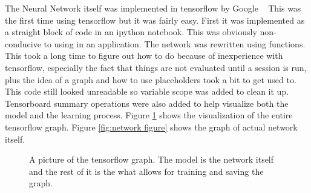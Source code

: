 \documentclass[12pt,twocolumn,letterpaper]{article}
\begin{document}
The Neural Network itself was implemented in tensorflow by Google ~\cite{Google} 
This was the first time using tensorflow but it was fairly easy. First it was 
implemented as a straight block of code in an ipython notebook. This was 
obviously non-conducive to using in an application. The network was rewritten 
using functions. This took a long time to figure out how to do because of 
inexperience with tensorflow, especially the fact that things are not evaluated 
until a session is run, plus the idea of a graph and how to use placeholders 
took a bit to get used to. This code still looked unreadable so variable scope 
was added to clean it up. Tensorboard summary operations were also added to help 
visualize both the model and the learning process. Figure \ref{fig:model image} shows the visualization 
of the entire tensorflow graph. Figure \ref{fig:network figure} shows the graph of actual network itself.


\begin{figure}[t]
\begin{center}
\end{center}
   \caption{A picture of the tensorflow graph. The model is the network itself 
   and the rest of it is the what allows for training and saving the graph.}
\label{fig:model image}
\end{figure}

\begin{figure*}
\begin{center}
\end{center}
   \caption{Picture of the network from tensorboard. 
   Larger image avaiable at \url{http://imgur.com/cx9DINa}}
\label{fig:network figure}
\end{figure*}
\end{document}
